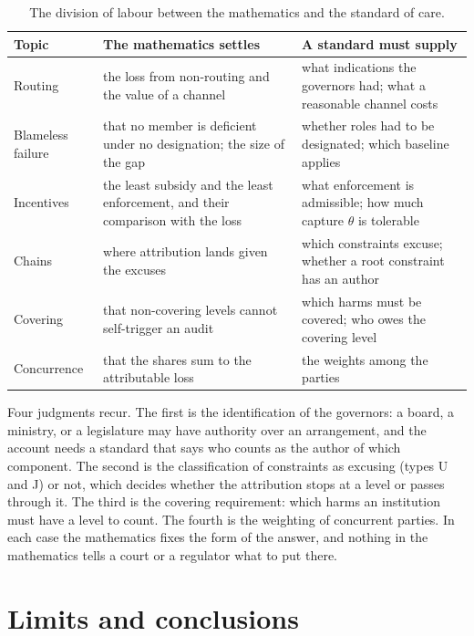 \documentclass[11pt]{article}
\theoremstyle{plain}
\theoremstyle{definition}
\begin{document}
\begin{table}[h]
\centering
\small
\begin{tabular}{@{}>{\raggedright\arraybackslash}p{2.3cm}>{\raggedright\arraybackslash}p{5.0cm}>{\raggedright\arraybackslash}p{5.0cm}@{}}
\hline
Topic & The mathematics settles & A standard must supply \\
\hline
Routing & the loss from non-routing and the value of a channel & what indications the governors had; what a reasonable channel costs \\
Blameless failure & that no member is deficient under no designation; the size of the gap & whether roles had to be designated; which baseline applies \\
Incentives & the least subsidy and the least enforcement, and their comparison with the loss & what enforcement is admissible; how much capture $\theta$ is tolerable \\
Chains & where attribution lands given the excuses & which constraints excuse; whether a root constraint has an author \\
Covering & that non-covering levels cannot self-trigger an audit & which harms must be covered; who owes the covering level \\
Concurrence & that the shares sum to the attributable loss & the weights among the parties \\
\hline
\end{tabular}
\caption{The division of labour between the mathematics and the standard of care.}
\label{tab:supply}
\end{table}

Four judgments recur. The first is the identification of the governors: a board, a ministry, or a legislature may have authority over an arrangement, and the account needs a standard that says who counts as the author of which component. The second is the classification of constraints as excusing (types U and J) or not, which decides whether the attribution stops at a level or passes through it. The third is the covering requirement: which harms an institution must have a level to count. The fourth is the weighting of concurrent parties. In each case the mathematics fixes the form of the answer, and nothing in the mathematics tells a court or a regulator what to put there.

\section{Limits and conclusions}\label{sec:limits}
\end{document}
